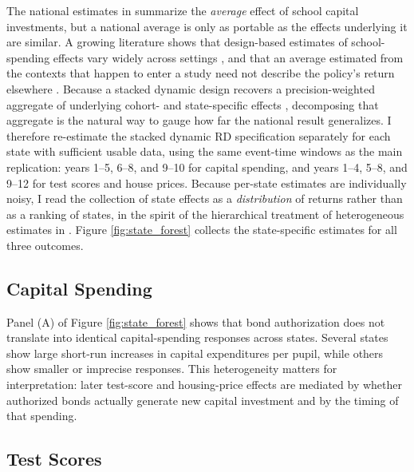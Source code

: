 The national estimates in \citet{biasi_what_2025} summarize the \emph{average} effect of school capital investments, but a national average is only as portable as the effects underlying it are similar. A growing literature shows that design-based estimates of school-spending effects vary widely across settings \citep{jackson2024impacts,handel2024contexts}, and that an average estimated from the contexts that happen to enter a study need not describe the policy's return elsewhere \citep{allcott2015site}. Because a stacked dynamic design recovers a precision-weighted aggregate of underlying cohort- and state-specific effects \citep{goodmanbacon2021difference,sunabraham2021estimating,callaway2021difference}, decomposing that aggregate is the natural way to gauge how far the national result generalizes. I therefore re-estimate the stacked dynamic RD specification separately for each state with sufficient usable data, using the same event-time windows as the main replication: years 1--5, 6--8, and 9--10 for capital spending, and years 1--4, 5--8, and 9--12 for test scores and house prices. Because per-state estimates are individually noisy, I read the collection of state effects as a \emph{distribution} of returns rather than as a ranking of states, in the spirit of the hierarchical treatment of heterogeneous estimates in \citet{meager2019understanding,meager2022aggregating}. Figure \ref{fig:state_forest} collects the state-specific estimates for all three outcomes.

\subsection{Capital Spending}

Panel (A) of Figure \ref{fig:state_forest} shows that bond authorization does not translate into identical capital-spending responses across states. Several states show large short-run increases in capital expenditures per pupil, while others show smaller or imprecise responses. This heterogeneity matters for interpretation: later test-score and housing-price effects are mediated by whether authorized bonds actually generate new capital investment and by the timing of that spending.

\subsection{Test Scores}

